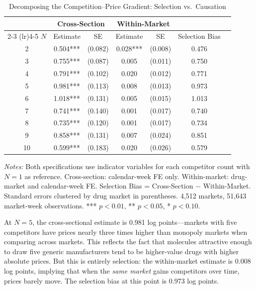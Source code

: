 \documentclass[12pt]{article}
\begin{document}
\begin{table}[H]
\centering
\caption{Decomposing the Competition--Price Gradient: Selection vs.\ Causation}\label{tab:selection_gap_table}
\begin{threeparttable}
\begin{tabular}{ccccccc}
\toprule
& \multicolumn{2}{c}{Cross-Section} & \multicolumn{2}{c}{Within-Market} & \\
\cmidrule(lr){2-3} \cmidrule(lr){4-5}
$N$ & Estimate & SE & Estimate & SE & Selection Bias \\
\midrule
2 & 0.504*** & (0.082) & 0.028*** & (0.008) & 0.476 \\
3 & 0.755*** & (0.087) & 0.005 & (0.011) & 0.750 \\
4 & 0.791*** & (0.102) & 0.020 & (0.012) & 0.771 \\
5 & 0.981*** & (0.113) & 0.008 & (0.013) & 0.973 \\
6 & 1.018*** & (0.131) & 0.005 & (0.015) & 1.013 \\
7 & 0.741*** & (0.140) & 0.001 & (0.017) & 0.740 \\
8 & 0.735*** & (0.120) & 0.001 & (0.017) & 0.734 \\
9 & 0.858*** & (0.131) & 0.007 & (0.024) & 0.851 \\
10 & 0.599*** & (0.183) & 0.020 & (0.026) & 0.579 \\
\bottomrule
\end{tabular}
\begin{tablenotes}[flushleft]
\small
\item \textit{Notes:} Both specifications use indicator variables for each competitor count with $N = 1$ as reference. Cross-section: calendar-week FE only. Within-market: drug-market and calendar-week FE. Selection Bias = Cross-Section $-$ Within-Market. Standard errors clustered by drug market in parentheses. 4,512 markets, 51,643 market-week observations. *** $p < 0.01$, ** $p < 0.05$, * $p < 0.10$.
\end{tablenotes}
\end{threeparttable}
\end{table}

At $N = 5$, the cross-sectional estimate is 0.981 log points---markets with five competitors have prices nearly three times higher than monopoly markets when comparing across markets. This reflects the fact that molecules attractive enough to draw five generic manufacturers tend to be higher-value drugs with higher absolute prices. But this is entirely selection: the within-market estimate is 0.008 log points, implying that when the \emph{same market} gains competitors over time, prices barely move. The selection bias at this point is 0.973 log points.
\end{document}
